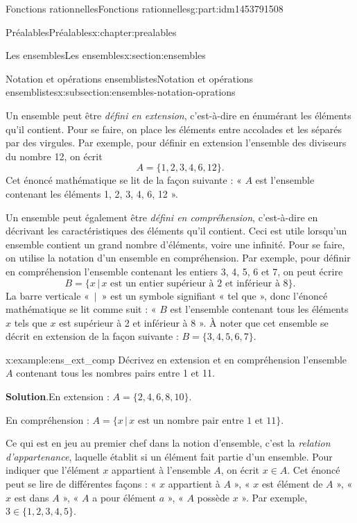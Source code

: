 \documentclass[oneside,10pt,]{book}
\newcommand{\blocktitlefont}{\relax}
\newcommand{\telque}{ \,|\, }
\begin{document}
\begin{partptx}{Fonctions rationnelles}{}{Fonctions rationnelles}{}{}{g:part:idm1453791508}
\begin{chapterptx}{Préalables}{}{Préalables}{}{}{x:chapter:prealables}
\begin{sectionptx}{Les ensembles}{}{Les ensembles}{}{}{x:section:ensembles}
\begin{subsectionptx}{Notation et opérations ensemblistes}{}{Notation et opérations ensemblistes}{}{}{x:subsection:ensembles-notation-oprations}
\par
Un ensemble peut être \emph{défini en extension}, c’est-à-dire en énumérant les éléments qu’il contient. Pour se faire, on place les éléments entre accolades et les séparés par des virgules. Par exemple, pour définir en extension l'ensemble des diviseurs du nombre 12, on écrit%
\begin{equation*}
A = \{1, 2, 3, 4, 6, 12\}\text{.}
\end{equation*}
Cet énoncé mathématique se lit de la façon suivante : « \(A\) est l'ensemble contenant les éléments 1, 2, 3, 4, 6, 12 ».%
\par
Un ensemble peut également être \emph{défini en compréhension}, c’est-à-dire en décrivant les caractéristiques des éléments qu’il contient. Ceci est utile lorsqu'un ensemble contient un grand nombre d'éléments, voire une infinité. Pour se faire, on utilise la notation d'un ensemble en compréhension. Par exemple, pour définir en compréhension l'ensemble contenant les entiers 3, 4, 5, 6 et 7, on peut écrire%
\begin{equation*}
B = \{x \telque x \text{ est un entier supérieur à 2 et inférieur à 8}\}\text{.}
\end{equation*}
La barre verticale « \(\telque\) » est un symbole signifiant « tel que », donc l'énoncé mathématique se lit comme suit : « \(B\) est l'ensemble contenant tous les éléments \(x\) tels que \(x\) est supérieur à 2 et inférieur à 8 ». À noter que cet ensemble se décrit en extension de la façon suivante : \(B = \{3, 4, 5, 6, 7\}\).%
\begin{example}{}{x:example:ens_ext_comp}%
Décrivez en extension et en compréhension l'ensemble \(A\) contenant tous les nombres pairs entre 1 et 11.%
\par\smallskip%
\noindent\textbf{\blocktitlefont Solution}.\hypertarget{g:solution:idm1453779916}{}\quad{}En extension : \(A = \{2,4,6,8,10\}\).%
\par
En compréhension : \(A = \{x \telque x \text{ est un nombre pair entre $1$ et $11$}\}\).%
\end{example}
Ce qui est en jeu au premier chef dans la notion d'ensemble, c'est la \emph{relation d’appartenance}, laquelle établit si un élément fait partie d'un ensemble. Pour indiquer que l'élément \(x\) appartient à l'ensemble \(A\), on écrit \(x \in A\). Cet énoncé peut se lire de différentes façons : « \(x\) appartient à \(A\) », « \(x\) est élément de \(A\) », « \(x\) est dans \(A\) », « \(A\) a pour élément \(a\) », « \(A\) possède \(x\) ». Par exemple, \(3 \in \{1,2,3,4,5\}\).%

\end{subsectionptx}
\end{sectionptx}
\end{chapterptx}
\end{partptx}
\end{document}
